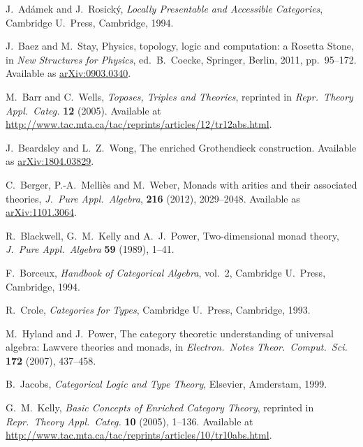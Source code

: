 \documentclass{amsart}
\theoremstyle{definition}
\begin{document}
\begin{thebibliography}{100}

 J.\ Ad\'{a}mek and J.\ Rosick\'{y}, \textsl{Locally Presentable and Accessible Categories}, Cambridge U.\ Press, Cambridge, 1994.

 J.\ Baez and M.\ Stay, Physics, topology, logic and computation: a Rosetta Stone, in \textsl{New Structures for Physics}, ed.\ B.\ Coecke, Springer, Berlin, 2011, pp.\ 95--172.  Available as \href{https://arxiv.org/abs/0903.0340}{arXiv:0903.0340}.
	
 M.\ Barr and C.\ Wells, \textsl{Toposes, Triples and Theories}, reprinted in \textsl{Repr.\ Theory Appl.\ Categ.} \textbf{12} (2005).   Available at \href{http://www.tac.mta.ca/tac/reprints/articles/12/tr12abs.html}{http://www.tac.mta.ca/tac/reprints/articles/12/tr12abs.html}.

 J.\ Beardsley and L.\ Z.\ Wong, The enriched Grothendieck construction.  Available as \href{https://arxiv.org/abs/1804.03829}{arXiv:1804.03829}.
	
 C.\ Berger, P.-A.\ Melli\`es and M.\ Weber, Monads with arities and their associated theories, \textsl{J.\ Pure Appl.\ Algebra}, \textbf{216} (2012), 2029--2048.  Available as \href{https://arxiv.org/abs/1101.3064}{arXiv:1101.3064}.

 R.\ Blackwell, G.\ M.\ Kelly and A.\ J.\ Power, Two-dimensional monad theory, 
\textsl{J.\ Pure Appl.\ Algebra} \textbf{59} (1989), 1--41. 
 
 F.\ Borceux, \textsl{Handbook of Categorical Algebra}, vol.\ 2, Cambridge U.\ Press, Cambridge, 1994.


 R.\ Crole, \textsl{Categories for Types}, Cambridge U.\ Press, Cambridge, 1993.

 M.\ Hyland and J.\ Power, The category theoretic understanding of 
universal algebra: Lawvere theories and monads, in \textsl{Electron.\ Notes Theor.\ Comput.\ 
Sci.} \textbf{172} (2007), 437--458.

 B.\ Jacobs, \textsl{Categorical Logic and Type Theory}, Elsevier, Amderstam, 1999.
	
 G.\ M.\ Kelly, \textsl{Basic Concepts of Enriched Category Theory}, reprinted in
\textsl{Repr.\ Theory Appl.\ Categ.} \textbf{10} (2005), 1--136.  Available at \href{http://www.tac.mta.ca/tac/reprints/articles/10/tr10abs.html}{http://www.tac.mta.ca/tac/reprints/articles/10/tr10abs.html}.


\end{thebibliography}
\end{document}
